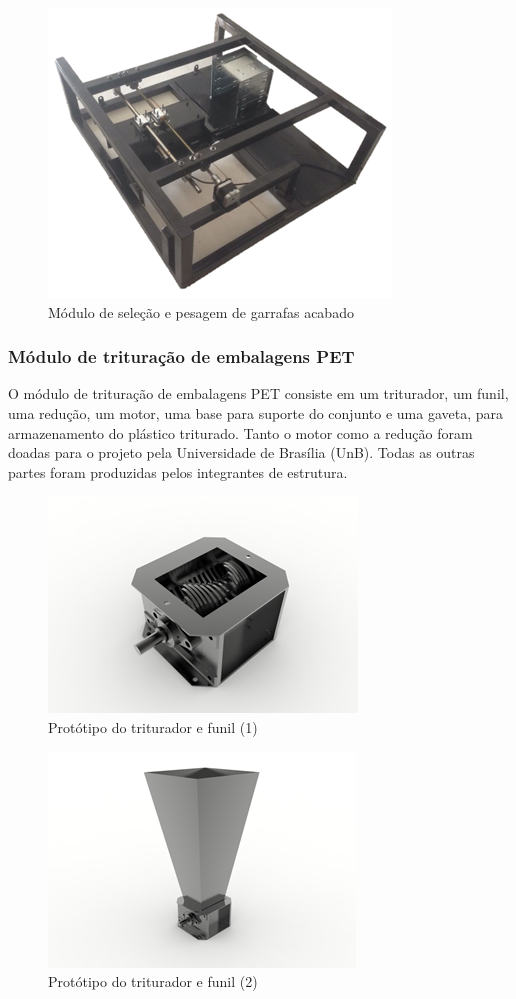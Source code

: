 \begin{figure}[!h]
	\centering
		\includegraphics[scale=0.8]{figuras/estrutura/12.png}
	\caption{Módulo de seleção e pesagem de garrafas acabado}
\end{figure}

\subsubsection{Módulo de trituração de embalagens PET}
O módulo de trituração de embalagens PET consiste em um triturador, um funil, uma redução, um motor, uma base para suporte do conjunto e uma gaveta, para armazenamento do plástico triturado. Tanto o motor como a redução foram doadas para o projeto pela Universidade de Brasília (UnB). Todas as outras partes foram produzidas pelos integrantes de estrutura.

\begin{figure}[!h]
	\centering
		\includegraphics[scale=1.1]{figuras/estrutura/13(1).png}
	\caption{Protótipo do triturador e funil (1)}
\end{figure}

\begin{figure}[!h]
	\centering
		\includegraphics[scale=0.9]{figuras/estrutura/13(2).png}
	\caption{Protótipo do triturador e funil (2)}
\end{figure}

